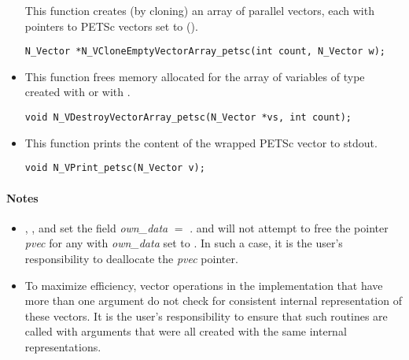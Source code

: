 \begin{itemize}
  This function creates (by cloning) an array of  parallel vectors,
  each with pointers to PETSc vectors set to ().
 
\begin{verbatim}
N_Vector *N_VCloneEmptyVectorArray_petsc(int count, N_Vector w);
\end{verbatim}


\item {}
 
 This function frees memory allocated for the array of  variables of
 type  created with  or with
 .
 

 \verb|void N_VDestroyVectorArray_petsc(N_Vector *vs, int count);|



\item {}
  
  This function prints the content of the wrapped PETSc vector to stdout.
 
    
  \verb|void N_VPrint_petsc(N_Vector v);|


\end{itemize}
\paragraph{\bf Notes} 
           
\begin{itemize}
                                        
\item
  {\warn}, , 
  and  set the field 
  {\em own\_data} $=$ . 
   and 
  will not attempt to free the pointer {\em pvec} for any  with
  {\em own\_data} set to . In such a case, it is the user's responsibility to
  deallocate the {\em pvec} pointer.

\item
  {\warn}To maximize efficiency, vector operations in the {\nvecpetsc} implementation
  that have more than one  argument do not check for
  consistent internal representation of these vectors. It is the user's 
  responsibility to ensure that such routines are called with 
  arguments that were all created with the same internal representations.

\end{itemize}

